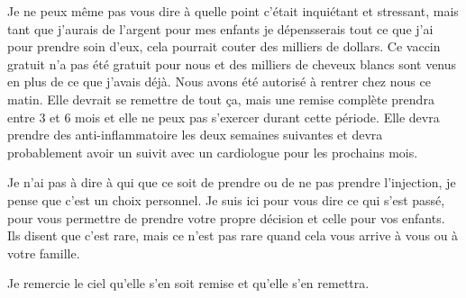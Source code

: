 {Je ne peux même pas vous dire à quelle point c'était inquiétant et stressant, mais tant que j'aurais de l'argent pour mes enfants je dépensserais tout ce que j'ai pour prendre soin d'eux, cela pourrait couter des milliers de dollars. Ce vaccin gratuit n'a pas été gratuit pour nous et des milliers de cheveux blancs sont venus en plus de ce que j'avais déjà. Nous avons été autorisé à rentrer chez nous ce matin. Elle devrait se remettre de tout ça, mais une remise complète prendra entre 3 et 6 mois et elle ne peux pas s'exercer durant cette période. Elle devra prendre des anti-inflammatoire les deux semaines suivantes et devra probablement avoir un suivit avec un cardiologue pour les prochains mois.

Je n'ai pas à dire à qui que ce soit de prendre ou de ne pas prendre l'injection, je pense que c'est un choix personnel. Je suis ici pour vous dire ce qui s'est passé, pour vous permettre de prendre votre propre décision et celle pour vos enfants. Ils disent que c'est rare, mais ce n'est pas rare quand cela vous arrive à vous ou à votre famille.

Je remercie le ciel qu'elle s'en soit remise et qu'elle s'en remettra.

}
